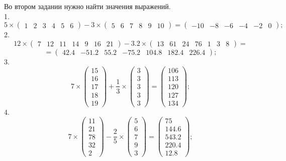\documentclass[14pt,a4paper]{extarticle}
\begin{document}
Во втором задании нужно найти значения выражений.\\
1. \[5\times\begin{pmatrix} 1 & 2 & 3 & 4 & 5 & 6 \end{pmatrix}-3\times\begin{pmatrix} 5 & 6 & 7 & 8 & 9 & 10 \end{pmatrix} = \begin{pmatrix} -10 & -8 & -6 & -4 & -2 & 0 \end{pmatrix};\]
2. \[12\times\begin{pmatrix} 7 & 12 & 11 & 14 & 9 & 16 & 21 \end{pmatrix}-3.2\times\begin{pmatrix} 13 & 61 & 24 & 76 & 1 & 3 & 8 \end{pmatrix} =\]
\[=\begin{pmatrix} 42.4 & -51.2 & 55.2 & -75.2 & 104.8 & 182.4 & 226.4 \end{pmatrix};\]
3. \[7\times\begin{pmatrix} 15 \\ 16 \\ 17 \\ 18 \\ 19 \end{pmatrix}+\frac{1}{3}\times\begin{pmatrix} 3 \\ 3 \\ 3 \\ 3 \\ 3 \end{pmatrix}
=\begin{pmatrix} 106 \\ 113 \\ 120 \\ 127 \\ 134 \end{pmatrix};\]
4. \[7\times\begin{pmatrix} 11 \\ 21 \\ 78 \\ 32 \\ 2 \end{pmatrix}-\frac{2}{5}\times\begin{pmatrix} 5 \\ 6 \\ 7 \\ 9 \\ 3 \end{pmatrix}
=\begin{pmatrix} 75 \\ 
    144.6 \\ 
    543.2 \\ 
    220.4 \\ 
    12.8 \end{pmatrix};\]
\end{document}
